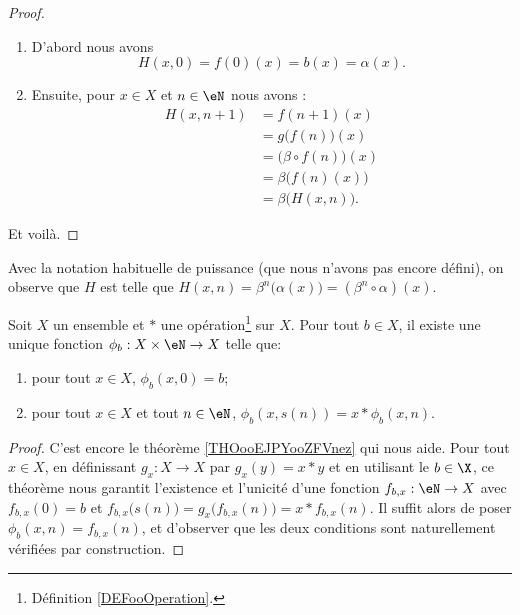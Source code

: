 \begin{proof}
	\begin{enumerate}
		\item
		      D'abord nous avons
		      \begin{equation}
			      H(x,0)=f(0) (x) =b(x)=\alpha(x).
		      \end{equation}
		\item
		      Ensuite, pour \( x\in X\) et \( n\in \eN\) nous avons :
		      \begin{subequations}
			      \begin{align}
				      H(x,n+1) & =f(n+1) (x)                      \\
				               & =g\big( f(n) \big) (x)           \\
				               & =\big( \beta\circ f(n) \big) (x) \\
				               & =\beta\big( f(n) (x) \big)       \\
				               & =\beta\big( H(x,n) \big).
			      \end{align}
		      \end{subequations}
	\end{enumerate}
	Et voilà.
\end{proof}

\begin{normaltext}	\label{NORMooPuissanceFonction}
	Avec la notation habituelle de puissance (que nous n'avons pas encore défini), on observe que \( H \) est telle que \( H(x,n) = \beta^n\big(\alpha(x)\big) = (\beta^n \circ \alpha) (x)\).
\end{normaltext}

\begin{corollary}	\label{CORooItereesOperation}
	Soit \( X \) un ensemble et \( * \) une opération\footnote{Définition \ref{DEFooOperation}.} sur \( X \). Pour tout \( b \in X \), il existe une unique fonction \( \phi_b : X \times \eN \to X \) telle que:
 	\begin{enumerate}
  		\item
			pour tout \( x \in X\), \( \phi_b(x, 0) = b \);
   		\item
	 		pour tout \( x \in X\) et tout \( n \in \eN\), \( \phi_b(x, s(n)) = x*\phi_b(x,n) \).
	\end{enumerate}
\end{corollary}

\begin{proof}
	C'est encore le théorème \ref{THOooEJPYooZFVnez} qui nous aide. Pour tout \( x \in X \), en définissant \( g_x : X \to X \) par \( g_x (y) = x*y \) et en utilisant le \( b \in \X \), ce théorème nous garantit l'existence et l'unicité d'une fonction \( f_{b,x} : \eN \to X \) avec \( f_{b,x}(0) = b \) et \( f_{b,x}\big(s(n)\big) = g_x\big(f_{b,x}(n)\big) = x * f_{b,x}(n) \). Il suffit alors de poser \( \phi_b(x,n) = f_{b,x}(n) \), et d'observer que les deux conditions sont naturellement vérifiées par construction.
\end{proof}


